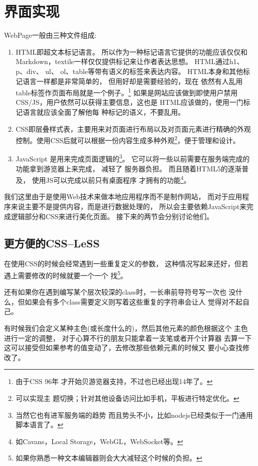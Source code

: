 \chapter{界面实现}
WebPage一般由三种文件组成:
\begin{enumerate}
	\item HTML即超文本标记语言。 所以作为一种标记语言它提供的功能应该仅仅和
		Markdown，textile一样仅仅提供标记来让作者表达思想。
		HTML通过h1、p、div、 ul、 ol、table等带有语义的标签来表达内容。 
		HTML本身和其他标记语言一样都是非常简单的， 但用好却是需要经验的，现在
		依然有人乱用table标签作页面布局就是一个例子。\footnote{由于CSS 96年
		才开始贝游览器支持，不过也已经出现14年了。}
		如果是网站应该做到即使用户禁用CSS/JS，用户依然可以获得主要信息，这也是
		HTML应该做的，使用一门标记语言就应该全面了解他每
		种标记的语义，不要乱用\cite{webdesign}。
	\item CSS即层叠样式表，主要用来对页面进行布局以及对页面元素进行精确的外观
		控制。使用CSS后就可以根据一份内容生成多种外观\footnote{可以实现主
		题切换；针对其他设备访问比如手机，平板进行特定优化。}，便于管理和设计。
	\item JavaScript 是用来完成页面逻辑的\footnote{当然它也有进军服务端的趋势
		而且势头不小，比如nodejs已经类似于一门通用脚本语言了。}。
		它可以将一些以前需要在服务端完成的功能拿到游览器上来完成， 减轻了
		服务器负担。 而且随着HTML5的逐渐普及， 使用JS可以完成以前只有桌面程序
		才拥有的功能\footnote{如Cavans，Local Storage，WebGL，WebSocket等。}。
\end{enumerate}

我们这里由于是使用Web技术来做本地应用程序而不是制作网站，
而对于应用程序来说主要不是提供内容，而是进行数据处理的，
所以会主要依赖JavaScript来完成逻辑部分和CSS来进行美化页面。
接下来的两节会分别讨论他们。
\section{更方便的CSS--LeSS}
在使用CSS\cite{css}的时候会经常遇到一些重复定义的参数， 
这种情况写起来还好，但若遇上需要修改的时候就要一个一个
找\footnote{如果你熟悉一种文本编辑器则会大大减轻这个时候的负担。}。

还有如果你在遇到编写某个层次较深的class时，一长串前导符号写一次也
没什么，但如果会有多个class需要定义则写着这些重复的字符串会让人
觉得对不起自己。

有时候我们会定义某种主色(或长度什么的)，然后其他元素的颜色根据这个
主色进行一定的调整， 对于心算不行的朋友只能拿着一支笔或者开个计算器
去算一下这可以接受但如果参考的值变动了，去修改那些依赖元素的时候又
要小心查找修改了。

